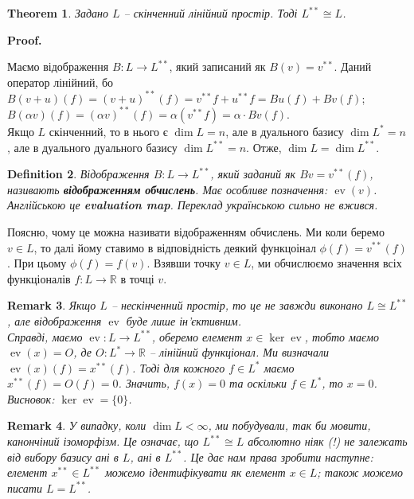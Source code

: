 \documentclass[a4paper, 10pt]{article}
\makeatletter
\theoremstyle{theoremdd}
\newtheorem{theorem}{Theorem}[subsection]
\newtheorem{definition}[theorem]{Definition}
\newtheorem{remark}[theorem]{Remark}
\DeclareMathOperator{\evaluation}{ev}
\renewenvironment{proof}[1][Proof.\\]{\par
\pushQED{\hfill \qed}%
\normalfont \topsep6\p@\@plus6\p@\relax
\trivlist
\item\relax
{\bfseries
#1\@addpunct{.}}\hspace\labelsep\ignorespaces
}{%
\popQED\endtrivlist\@endpefalse
}
\makeatother
\begin{document}
\begin{theorem}
Задано $L$ -- скінченний лінійний простір. Тоді $L^{**} \cong L$.
\end{theorem}

\begin{proof}
Маємо відображення $B \colon L \to L^{**}$, який записаний як $B(v) = v^{**}$. Даний оператор лінійний, бо\\
$B(v+u)(f) = (v+u)^{**}(f) = v^{**}f + u^{**}f = Bu(f) + Bv(f)$;\\
$B(\alpha v)(f) = (\alpha v)^{**}(f) = \alpha (v^{**}f) = \alpha \cdot Bv(f)$.\\
Якщо $L$ скінченний, то в нього є $\dim L = n$, але в дуального базису $\dim L^{*} = n$, але в дуального дуального базису $\dim L^{**} = n$. Отже, $\dim L = \dim L^{**}$.
\end{proof}

\begin{definition}
Відображення $B \colon L \to L^{**}$, який заданий як $Bv = v^{**}(f)$, називають \textbf{відображенням обчислень}. Має особливе позначення: $\evaluation(v)$.\\
Англійською це \textbf{evaluation map}. Переклад українською сильно не вжився.
\end{definition}
\noindent
Поясню, чому це можна називати відображенням обчислень. Ми коли беремо $v \in L$, то далі йому ставимо в відповідність деякий функцоінал $\phi(f) = v^{**}(f)$. При цьому $\phi(f) = f(v)$. Взявши точку $v \in L$, ми обчислюємо значення всіх функціоналів $f \colon L \to \mathbb{R}$ в точці $v$.

\begin{remark}
Якщо $L$ -- нескінченний простір, то це не завжди виконано $L \cong L^{**}$, але відображення $\evaluation$ буде лише ін'єктивним.\\
Справді, маємо $\evaluation \colon L \to L^{**}$, оберемо елемент $x \in \ker \evaluation$, тобто маємо $\evaluation(x) = O$, де $O \colon L^* \to \mathbb{R}$ -- лінійний функціонал. Ми визначали $\evaluation(x)(f) = x^{**}(f)$. Тоді для кожного $f \in L^*$ маємо $x^{**}(f) = O(f) = 0$. Значить, $f(x) = 0$ та оскільки $f \in L^*$, то $x = 0$. Висновок: $\ker \evaluation = \{0\}$.
\end{remark}

\begin{remark}
У випадку, коли $\dim L < \infty$, ми побудували, так би мовити, канончіний ізоморфізм. Це означає, що $L^{**} \cong L$ абсолютно ніяк (!) не залежать від вибору базису ані в $L$, ані в $L^{**}$. Це дає нам права зробити наступне: елемент $x^{**} \in L^{**}$ можемо ідентифікувати як елемент $x \in L$; також можемо писати $L = L^{**}$.
\end{remark}
\end{document}
